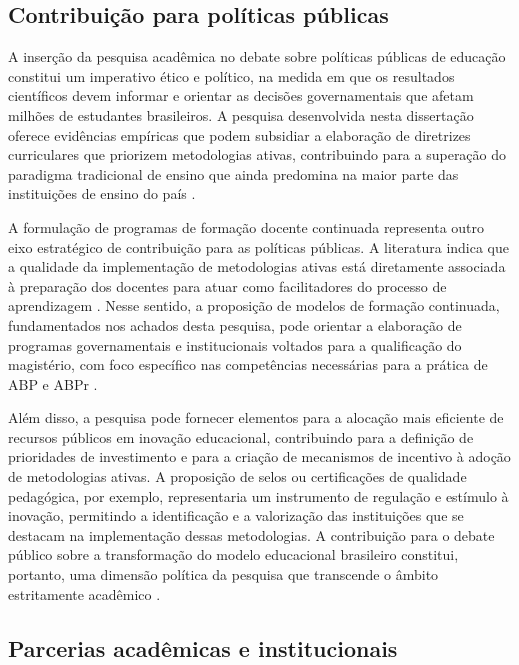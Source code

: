 \subsection{Contribuição para políticas públicas}
\label{subsec:politicas_publicas}

A inserção da pesquisa acadêmica no debate sobre políticas públicas de educação constitui um imperativo ético e político, na medida em que os resultados científicos devem informar e orientar as decisões governamentais que afetam milhões de estudantes brasileiros. A pesquisa desenvolvida nesta dissertação oferece evidências empíricas que podem subsidiar a elaboração de diretrizes curriculares que priorizem metodologias ativas, contribuindo para a superação do paradigma tradicional de ensino que ainda predomina na maior parte das instituições de ensino do país \cite{VEIGA2014}.

A formulação de programas de formação docente continuada representa outro eixo estratégico de contribuição para as políticas públicas. A literatura indica que a qualidade da implementação de metodologias ativas está diretamente associada à preparação dos docentes para atuar como facilitadores do processo de aprendizagem \cite{SOUSA2025}. Nesse sentido, a proposição de modelos de formação continuada, fundamentados nos achados desta pesquisa, pode orientar a elaboração de programas governamentais e institucionais voltados para a qualificação do magistério, com foco específico nas competências necessárias para a prática de ABP e ABPr \cite{TEODORO2024}.

Além disso, a pesquisa pode fornecer elementos para a alocação mais eficiente de recursos públicos em inovação educacional, contribuindo para a definição de prioridades de investimento e para a criação de mecanismos de incentivo à adoção de metodologias ativas. A proposição de selos ou certificações de qualidade pedagógica, por exemplo, representaria um instrumento de regulação e estímulo à inovação, permitindo a identificação e a valorização das instituições que se destacam na implementação dessas metodologias. A contribuição para o debate público sobre a transformação do modelo educacional brasileiro constitui, portanto, uma dimensão política da pesquisa que transcende o âmbito estritamente acadêmico \cite{BACICH2018}.

\subsection{Parcerias acadêmicas e institucionais}
\label{subsec:parcerias}

